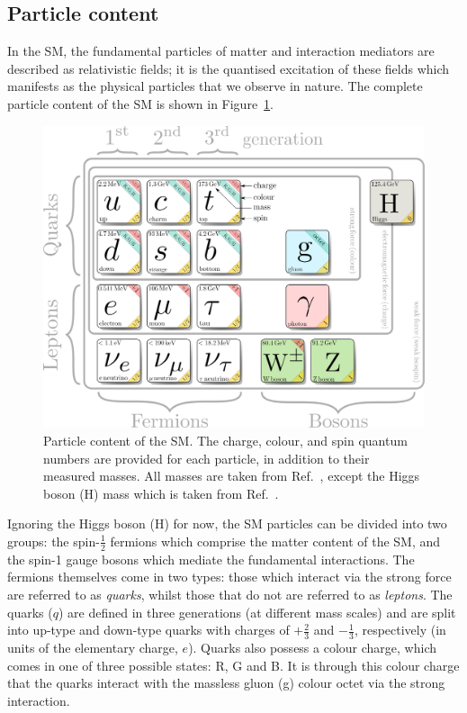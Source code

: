 \subsection{Particle content}\label{sec:sm_particlecontent}
In the SM, the fundamental particles of matter and interaction mediators are described as relativistic fields; it is the quantised excitation of these fields which manifests as the physical particles that we observe in nature. The complete particle content of the SM is shown in Figure~\ref{fig:sm_particlecontent}.

\begin{figure}[htb!]
  \centering
  \includegraphics[width=1\linewidth]{Figures/theory/sm_drawing.pdf}
  \caption[Particle content of the SM]
  {
    Particle content of the SM. The charge, colour, and spin quantum numbers are provided for each particle, in addition to their measured masses. All masses are taken from Ref.~\cite{Zyla:2020zbs}, except the Higgs boson (H) mass which is taken from Ref.~\cite{Sirunyan:2020xwk}.
  }
  \label{fig:sm_particlecontent}
\end{figure}

Ignoring the Higgs boson (H) for now, the SM particles can be divided into two groups: the spin-$\frac{1}{2}$ fermions which comprise the matter content of the SM, and the spin-1 gauge bosons which mediate the fundamental interactions. The fermions themselves come in two types: those which interact via the strong force are referred to as \textit{quarks}, whilst those that do not are referred to as \textit{leptons}. The quarks ($q$) are defined in three generations (at different mass scales) and are split into up-type and down-type quarks with charges of $+\frac{2}{3}$ and $-\frac{1}{3}$, respectively (in units of the elementary charge, $e$). Quarks also possess a colour charge, which comes in one of three possible states: R, G and B. It is through this colour charge that the quarks interact with the massless gluon (g) colour octet via the strong interaction.

